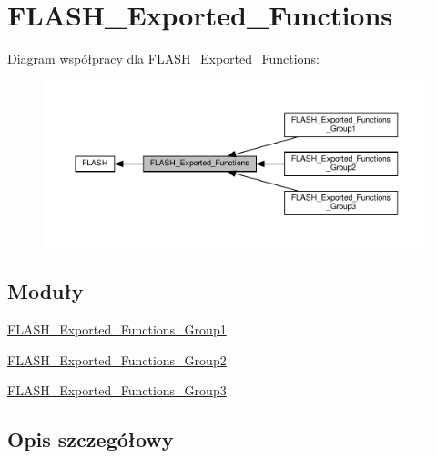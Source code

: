 \hypertarget{group___f_l_a_s_h___exported___functions}{}\section{F\+L\+A\+S\+H\+\_\+\+Exported\+\_\+\+Functions}
\label{group___f_l_a_s_h___exported___functions}
Diagram współpracy dla F\+L\+A\+S\+H\+\_\+\+Exported\+\_\+\+Functions\+:\nopagebreak
\begin{figure}[H]
\begin{center}
\leavevmode
\includegraphics[width=350pt]{group___f_l_a_s_h___exported___functions}
\end{center}
\end{figure}
\subsection*{Moduły}
\begin{DoxyCompactItemize}
\item 
\hyperlink{group___f_l_a_s_h___exported___functions___group1}{F\+L\+A\+S\+H\+\_\+\+Exported\+\_\+\+Functions\+\_\+\+Group1}
\item 
\hyperlink{group___f_l_a_s_h___exported___functions___group2}{F\+L\+A\+S\+H\+\_\+\+Exported\+\_\+\+Functions\+\_\+\+Group2}
\item 
\hyperlink{group___f_l_a_s_h___exported___functions___group3}{F\+L\+A\+S\+H\+\_\+\+Exported\+\_\+\+Functions\+\_\+\+Group3}
\end{DoxyCompactItemize}


\subsection{Opis szczegółowy}
